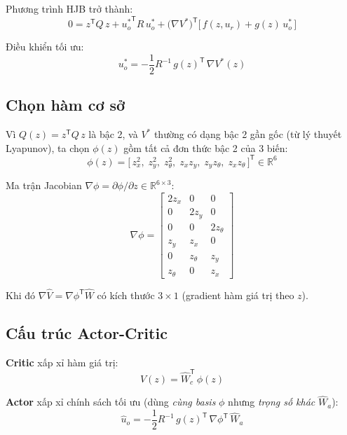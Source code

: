 \documentclass[12pt,a4paper]{article}
\newcommand{\R}{\mathbb{R}}
\newcommand{\T}{\mathsf{T}}
\begin{document}
Phương trình HJB trở thành:
\begin{equation}\label{eq:hjb_wmr}
    0 = z^\T Q\, z + {u_o^*}^\T R\, u_o^* + \big(\nabla V^*\big)^\T \big[\,f(z,u_r) + g(z)\, u_o^*\,\big]
\end{equation}

Điều khiển tối ưu:
\begin{equation}\label{eq:u_opt_wmr}
    u_o^* = -\frac{1}{2} R^{-1}\, g(z)^\T\, \nabla V^*(z)
\end{equation}

\subsection{Chọn hàm cơ sở}

Vì $Q(z) = z^\T Q\,z$ là bậc 2, và $V^*$ thường có dạng bậc 2 gần gốc (từ lý thuyết Lyapunov), ta chọn $\phi(z)$ gồm tất cả đơn thức bậc 2 của 3 biến:
\begin{equation}\label{eq:basis}
    \phi(z) = \big[\,z_x^2,\; z_y^2,\; z_\theta^2,\; z_x z_y,\; z_y z_\theta,\; z_x z_\theta\,\big]^\T \in \R^6
\end{equation}

Ma trận Jacobian $\nabla\phi = \partial\phi/\partial z \in \R^{6\times 3}$:
\begin{equation}\label{eq:nabla_phi}
    \nabla\phi = \begin{bmatrix}
        2z_x & 0 & 0 \\
        0 & 2z_y & 0 \\
        0 & 0 & 2z_\theta \\
        z_y & z_x & 0 \\
        0 & z_\theta & z_y \\
        z_\theta & 0 & z_x
    \end{bmatrix}
\end{equation}

Khi đó $\nabla\hat{V} = \nabla\phi^\T \hat{W}$ có kích thước $3\times 1$ (gradient hàm giá trị theo $z$).

\subsection{Cấu trúc Actor-Critic}

\textbf{Critic} xấp xỉ hàm giá trị:
\begin{equation}
    \hat{V}(z) = \hat{W}_c^\T\, \phi(z)
\end{equation}

\textbf{Actor} xấp xỉ chính sách tối ưu (dùng \textit{cùng basis} $\phi$ nhưng \textit{trọng số khác} $\hat{W}_a$):
\begin{equation}\label{eq:actor_policy}
    \hat{u}_o = -\frac{1}{2} R^{-1}\, g(z)^\T\, \nabla\phi^\T\, \hat{W}_a
\end{equation}
\end{document}
